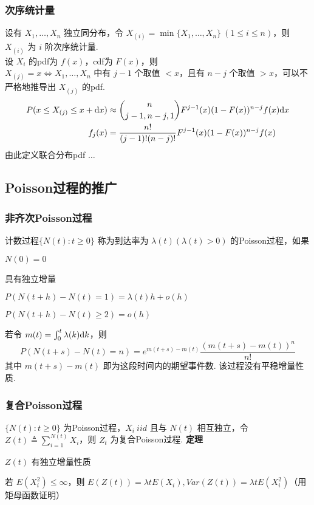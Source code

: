 \documentclass[./main.tex]{subfiles}
\begin{document}
\subsubsection{次序统计量}
设有 $X_1,\dots,X_n$ 独立同分布，令 $X_{(i)}=\min\{X_1,\dots,X_n\}\ (1\le i\le n)$，则 $X_{(i)}$ 为 $i$ 阶次序统计量. \\
\indent 设 $X_i$ 的pdf为 $f(x)$，cdf为 $F(x)$，则\\
\indent $X_{(j)}=x\iff X_1,\dots,X_n$ 中有 $j-1$ 个取值 $<x$，且有 $n-j$ 个取值 $>x$，可以不严格地推导出 $X_{(j)}$ 的pdf. 
\begin{align}
    P(x\le X_{(j)}\le x+\text{d}x) & \approx\binom{n}{j-1,n-j,1}F^{j-1}(x)(1-F(x))^{n-j}f(x)\text{d}x\notag \\
    f_j(x)                     & =\frac{n!}{(j-1)!(n-j)!}F^{j-1}(x)(1-F(x))^{n-j}f(x)
\end{align}
由此定义联合分布pdf $\dots$

\subsection{Poisson过程的推广}
\subsubsection{非齐次Poisson过程}
计数过程$\{N(t):t\ge 0\}$ 称为到达率为 $\lambda(t)(\lambda(t)>0)$ 的Poisson过程，如果
\begin{enumerate*}
    \item $N(0)=0$
    \item 具有独立增量
    \item $P(N(t+h)-N(t)=1)=\lambda(t)h+o(h)$
    \item $P(N(t+h)-N(t)\ge 2)=o(h)$
\end{enumerate*}
若令 $m(t)=\int_0^t\lambda(k)\text{d}k$，则 $$P(N(t+s)-N(t)=n)=e^{m(t+s)-m(t)}\frac{(m(t+s)-m(t))^n}{n!}$$ 其中 $m(t+s)-m(t)$ 即为这段时间内的期望事件数. 
该过程没有平稳增量性质. 
\subsubsection{复合Poisson过程}
$\{N(t):t\ge 0\}$ 为Poisson过程，$X_i\ iid$ 且与 $N(t)$ 相互独立，令$Z(t)\triangleq\sum_{i=1}^{N(t)}X_i$，则 $Z_t$ 为复合Poisson过程. 
\noindent\textbf{定理}
\begin{enumerate*}
    \item $Z(t)$ 有独立增量性质
    \item 若 $E(X_i^2)\le\infty$，则 $E(Z(t))=\lambda tE(X_i),Var(Z(t))=\lambda tE(X_i^2)$（用矩母函数证明）
\end{enumerate*}
\end{document}
